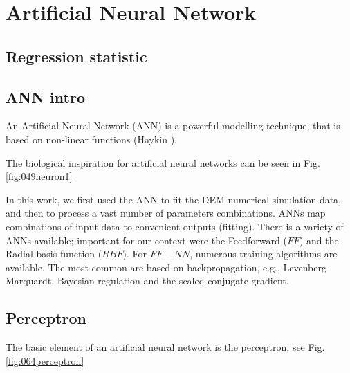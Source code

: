 
\chapter{Artificial Neural Network}
\label{cap:ann}

\section{Regression statistic}
\label{sec:regressionstatistic}

\section{ANN intro}
\label{sec:annintro}

An Artificial Neural Network (\acs{ANN}) is a powerful modelling technique, 
that is based on non-linear functions (Haykin \cite{RefWorks:158}). 


The biological inspiration for artificial neural networks can be seen in Fig.
\ref{fig:049neuron1}



In this work, we first used the \acs{ANN} to fit the \acs{DEM} numerical simulation
data, and then to process a vast number of parameters combinations. 
\acs{ANNs} map combinations of input data to convenient outputs (fitting). 
There is a variety of \acs{ANNs} available; important for our context were the
Feedforward ($FF$) and the Radial basis function ($RBF$). 
For $FF-NN$, 
numerous training algorithms are available. The most common are based on
backpropagation, e.g., Levenberg-Marquardt, Bayesian regulation and the scaled
conjugate gradient.

\section{Perceptron}
\label{sec:perceptron}

The basic element of an artificial neural network is the perceptron, see Fig.
\ref{fig:064perceptron}\\


